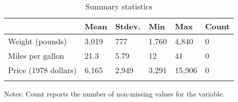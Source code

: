 \documentclass{article}
\begin{document}
\begin{table}[tbp] \centering
{}

\caption{Summary statistics}
\label{tab:my_summary_stats}
\begin{tabularx}{\linewidth}{lCCCCC}

\toprule
{}&{Mean}&{Stdev.}&{Min}&{Max}&{Count} \tabularnewline
\midrule \addlinespace[\belowrulesep]
Weight (pounds)&3,019&777&1,760&4,840&0 \tabularnewline
Miles per gallon&21.3&5.79&12&41&0 \tabularnewline
Price (1978 dollars)&6,165&2,949&3,291&15,906&0 \tabularnewline
\bottomrule \addlinespace[\belowrulesep]

\end{tabularx}
\begin{flushleft}
\footnotesize Notes: Count reports the number of non-missing values for the variable.
\end{flushleft}
\end{table}
\end{document}
